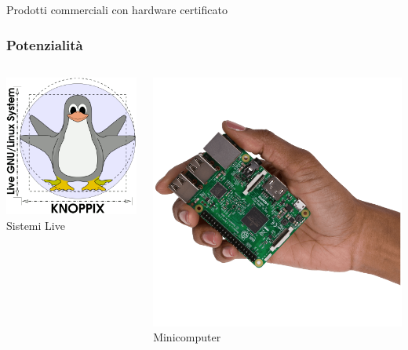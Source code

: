 \documentclass{beamer}
\begin{document}
\begin{frame}
\begin{itemize}
            \begin{minipage}{.8\linewidth} Prodotti commerciali con hardware certificato \end{minipage}
    \end{itemize}
\end{frame}

\begin{frame}
    \frametitle{Potenzialità}

    \begin{columns}
    \begin{column}{.25\textwidth}
        \includegraphics[width=.9\linewidth]{img/knoppix.png}
        \centering
        Sistemi Live
    \end{column}

    \begin{column}{.25\textwidth}
        \includegraphics[width=.9\linewidth]{img/raspberry.png}
        \centering
        Minicomputer
    \end{column}


\end{columns}
\end{frame}
\end{document}
